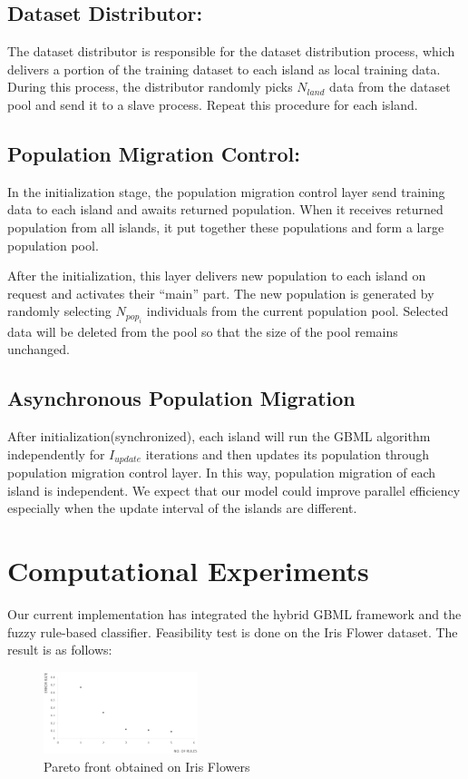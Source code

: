 \documentclass[conference]{IEEEtran}
\begin{document}
	\subsection{Dataset Distributor:}
	The dataset distributor is responsible for the dataset distribution process, which delivers a portion of the training dataset to each island as local training data. During this process, the distributor randomly picks $N_{land}$ data from the dataset pool and send it to a slave process. Repeat this procedure for each island.
  \subsection{Population Migration Control:}
  In the initialization stage, the population migration control layer send training data to each island and awaits returned population. When it receives returned population from all islands, it put together these populations and form a large population pool. 
	
	After the initialization, this layer delivers new population to each island on request and activates their “main” part. The new population is generated by randomly selecting $ N_{pop_i}$ individuals from the current population pool. Selected data will be deleted from the pool so that the size of the pool remains unchanged.
	
  \subsection{Asynchronous Population Migration}
  After initialization(synchronized), each island will run the GBML algorithm independently for $I_{update}$ iterations and then updates its population through population migration control layer. In this way, population migration of each island is independent. We expect that our model could improve parallel efficiency especially when the update interval of the islands are different. 
  
  
  \section{Computational Experiments}

	 Our current implementation has integrated the hybrid GBML framework and the fuzzy rule-based classifier. Feasibility test is done on the Iris Flower dataset. The result is as follows:

 \begin{figure}[H]
 	\centering
 	\includegraphics[width=0.4\textwidth]{figures/iris.png}
 	\caption{Pareto front obtained on Iris Flowers}\label{fig:digit}
 \end{figure}
\end{document}
